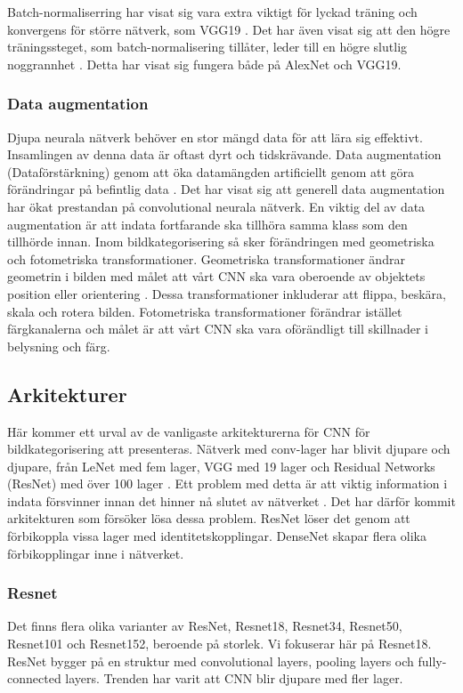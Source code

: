 \documentclass[]{kththesis}
\begin{document}
Batch-normaliserring har visat sig vara extra viktigt för lyckad träning och konvergens för större nätverk, som VGG19 \parencite{simon2016imagenet}. Det har även visat sig att den högre träningssteget, som batch-normalisering tillåter, leder till en högre slutlig noggrannhet \parencite{simon2016imagenet}. Detta har visat sig fungera både på AlexNet och VGG19.

\subsubsection{Data augmentation}
Djupa neurala nätverk behöver en stor mängd data för att lära sig effektivt. Insamlingen av denna data är oftast dyrt och tidskrävande. Data augmentation (Dataförstärkning) genom att öka datamängden artificiellt genom att göra förändringar på befintlig data \parencite{taylor2017improving}. Det har visat sig att generell data augmentation har ökat prestandan på convolutional neurala nätverk. En viktig del av data augmentation är att indata fortfarande ska tillhöra samma klass som den tillhörde innan. Inom bildkategorisering så sker förändringen med geometriska och fotometriska transformationer. Geometriska transformationer ändrar geometrin i bilden med målet att vårt CNN ska vara oberoende av objektets position eller orientering \parencite{taylor2017improving}. Dessa transformationer inkluderar att flippa, beskära, skala och rotera bilden. Fotometriska transformationer förändrar istället färgkanalerna och målet är att vårt CNN ska vara oförändligt till skillnader i belysning och färg. 


\subsection{Arkitekturer}
Här kommer ett urval av de vanligaste arkitekturerna för CNN för bildkategorisering att presenteras. Nätverk med conv-lager har blivit djupare och djupare, från LeNet \parencite{lecun1998gradient} med fem lager, VGG med 19 lager \parencite{simonyan2014very} och Residual Networks (ResNet) med över 100 lager \parencite{he2016deep}. Ett problem med detta är att viktig information i indata försvinner innan det hinner nå slutet av nätverket \parencite{huang2017densely}. Det har därför kommit arkitekturen som försöker lösa dessa problem. ResNet löser det genom att förbikoppla vissa lager med identitetskopplingar. DenseNet skapar flera olika förbikopplingar inne i nätverket.

\subsubsection{Resnet}
Det finns flera olika varianter av ResNet, Resnet18, Resnet34, Resnet50, Resnet101 och Resnet152, beroende på storlek. Vi fokuserar här på Resnet18. ResNet bygger på en struktur med convolutional layers, pooling layers och fully-connected layers. Trenden har varit att CNN blir djupare med fler lager.
\end{document}
